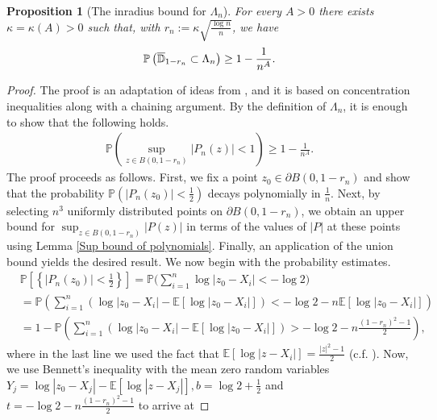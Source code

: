 \documentclass[9pt,a4paper,reqno]{amsart}
\theoremstyle{mine}
\newtheorem{prop}[thm]{Proposition}
\theoremstyle{definition}
\theoremstyle{remark}
\newcommand{\mb}{\mathbb}
\begin{document}
\begin{prop}[The inradius bound for $\Lambda_n$]
\label{location of the components of the lemniscate: lemma}
      For every $A>0$ there exists $\kappa=\kappa(A)>0$ such that, with $r_n:=\kappa\sqrt{\frac{\log n}{n}}$, we have
     \begin{align} \label{location of components of the lemniscate :eq}
         \mb{P}\left(\overline{\mb{D}}_{1-r_n} \vspace{.05in} \subset \vspace{.05in} \Lambda_n \right) \geq 1 - \frac{1}{n^A}.
     \end{align}
\end{prop}
     
\begin{proof}
The proof is an adaptation of ideas from \cite{KLR}, and it is based on concentration inequalities along with a chaining argument. By the definition of $\Lambda_n$, it is enough to show that the following holds.
    \begin{align*}
        \mb{P}\left( \sup_{z \in B(0,1-r_n)}|P_n(z)| <1 \right) \geq 1 - \frac{1}{n^A}.
    \end{align*}
    The proof proceeds as follows. First, we fix a point $z_0 \in \partial B(0,1-r_n)$ and show that 
the probability $\mathbb{P}\!\left(|P_n(z_0)| < \tfrac{1}{2}\right)$ decays polynomially in $\frac{1}{n}$. Next, by selecting $n^3$ 
uniformly distributed points on $\partial B(0,1-r_n)$, we obtain an upper bound for 
$\sup_{z \in B(0,1-r_n)} |P(z)|$ in terms of the values of $|P|$ at these points using Lemma \ref{Sup bound of polynomials}. Finally, an application of the union bound yields the desired result. 
We now begin with the probability estimates.
    \begin{align*}
                &\mathbb{P}\left[\left\{|P_n(z_0)|<\frac{1}{2}\right\}\right]=\mathbb{P}\Big(\sum_{i=1}^n\log|z_0-X_i|<-\log2\Big) \\
                &=\mathbb{P}\left(\sum_{i=1}^n(\log|z_0-X_i|-\mathbb{E}[\log|z_0-X_i|])<-\log2-n\mathbb{E}[\log|z_0-X_i|]\right) \\
                &=1-\mathbb{P}\left(\sum_{i=1}^n(\log|z_0-X_i|-\mathbb{E}[\log|z_0-X_i|])>-\log2-n\frac{(1-r_n)^2-1}{2}\right),
    \end{align*}
        where in the last line we used the fact that $\mathbb{E}[\log|z-X_i|]=\frac{|z|^2-1}{2}$ (c.f. \cite[Example 1.7]{KLR}). Now, we use Bennett's inequality with the mean zero random variables $Y_j=\log|z_0-X_j|-\mb{E}[\log|z-X_j|], b=\log2+\frac{1}{2}$ and $t=-\log2-n\frac{(1-r_n)^2-1}{2}$ to arrive at

\end{proof}
\end{document}
